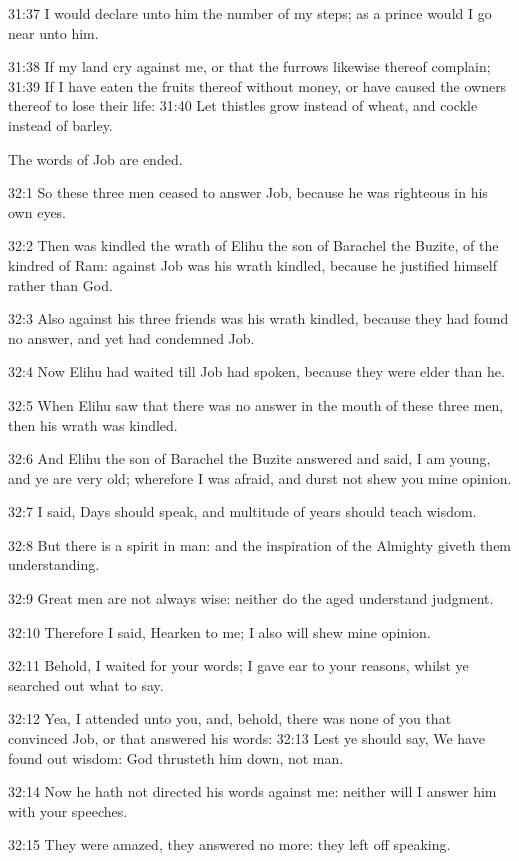 31:37 I would declare unto him the number of my steps; as a prince would I go near unto him.

31:38 If my land cry against me, or that the furrows likewise thereof complain; 31:39 If I have eaten the fruits thereof without money, or have caused the owners thereof to lose their life: 31:40 Let thistles grow instead of wheat, and cockle instead of barley.

The words of Job are ended.

32:1 So these three men ceased to answer Job, because he was righteous in his own eyes.

32:2 Then was kindled the wrath of Elihu the son of Barachel the Buzite, of the kindred of Ram: against Job was his wrath kindled, because he justified himself rather than God.

32:3 Also against his three friends was his wrath kindled, because they had found no answer, and yet had condemned Job.

32:4 Now Elihu had waited till Job had spoken, because they were elder than he.

32:5 When Elihu saw that there was no answer in the mouth of these three men, then his wrath was kindled.

32:6 And Elihu the son of Barachel the Buzite answered and said, I am young, and ye are very old; wherefore I was afraid, and durst not shew you mine opinion.

32:7 I said, Days should speak, and multitude of years should teach wisdom.

32:8 But there is a spirit in man: and the inspiration of the Almighty giveth them understanding.

32:9 Great men are not always wise: neither do the aged understand judgment.

32:10 Therefore I said, Hearken to me; I also will shew mine opinion.

32:11 Behold, I waited for your words; I gave ear to your reasons, whilst ye searched out what to say.

32:12 Yea, I attended unto you, and, behold, there was none of you that convinced Job, or that answered his words: 32:13 Lest ye should say, We have found out wisdom: God thrusteth him down, not man.

32:14 Now he hath not directed his words against me: neither will I answer him with your speeches.

32:15 They were amazed, they answered no more: they left off speaking.

